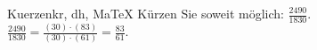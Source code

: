 \begin{MAufgabe}{Kuerzen}{kr, dh, MaTeX}
K\"urzen Sie soweit m\"oglich: $\frac{2490}{1830}$.\\ 
\ifLsg\MLoesung
\quad $\frac{2490}{1830}=\frac{(30)\cdot(83)}{(30)\cdot(61)}=\frac{83}{61}$.\else\relax\fi
 \end{MAufgabe}